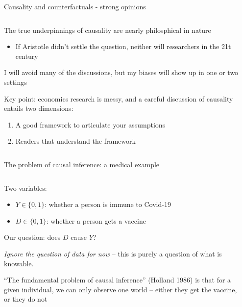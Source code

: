 \documentclass[notes,11pt, aspectratio=169]{beamer}
\newenvironment{wideitemize}{\itemize\addtolength{\itemsep}{10pt}}{\enditemize}
\begin{document}
\begin{frame}{Causality and counterfactuals - strong opinions}
\begin{columns}[T] %
\begin{column}{.65\textwidth}
  \begin{wideitemize}
  \item The true underpinnings of causality are nearly philosphical in nature
    \begin{itemize}
    \item If Aristotle didn't settle the question, neither will
      researchers in the 21t century
    \end{itemize}
  \item I will avoid many of the discussions, but my biases will show up in one or two settings
  \item Key point: economics research is messy, and a careful
    discussion of causality entails two dimensions:
    \begin{enumerate}
    \item A good framework to articulate your assumptions
    \item Readers that understand the framework
    \end{enumerate}
  \end{wideitemize}
\end{column}%
\hfill%
\begin{column}{.38\textwidth}

\end{column}%
\end{columns}
\end{frame}

\begin{frame}{The problem of causal inference: a medical example}
\begin{columns}[T] %
\begin{column}{.8\textwidth}
  \begin{wideitemize}
    \item  Two variables:
    \begin{itemize}
    \item $Y \in \{0, 1\}$: whether a person is immune to Covid-19
    \item $D \in \{0, 1\}$: whether a person gets a vaccine
    \end{itemize}
  \item Our question: does $D$ cause $Y$?
  \item \emph{Ignore the question of data for now} -- this is purely a
    question of what is knowable.
  \item ``The fundamental problem of causal inference'' (Holland 1986)
    is that for a given individual, we can only observe one world --
    either they get the vaccine, or they do not
  \end{wideitemize}
\end{column}%
\hfill%
\begin{column}{.38\textwidth}
\end{column}%
\end{columns}
\end{frame}
\end{document}
